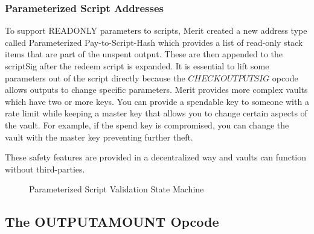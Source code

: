 \documentclass{article}
\begin{document}
\subsubsection{Parameterized Script Addresses}

To support READONLY parameters to scripts, Merit created a new address type called
Parameterized Pay-to-Script-Hash which provides a list of read-only stack items
that are part of the unspent output. These are then appended to the scriptSig
after the redeem script is expanded. It is essential to lift some parameters
out of the script directly because the $CHECKOUTPUTSIG$ opcode allows outputs
to change specific parameters. Merit provides more complex vaults which have two or
more keys. You can provide a spendable key to someone with a rate limit while
keeping a master key that allows you to change certain aspects of the vault.
For example, if the spend key is compromised, you can change the vault with
the master key preventing further theft.

These safety features are provided in a decentralized way and vaults can function
without third-parties.

\begin{figure}[H]
    \begin{center}
    \end{center}
    \caption{Parameterized Script Validation State Machine}
\end{figure}

\subsection{The OUTPUTAMOUNT Opcode}

\begin{center}
\end{center}
\end{document}
